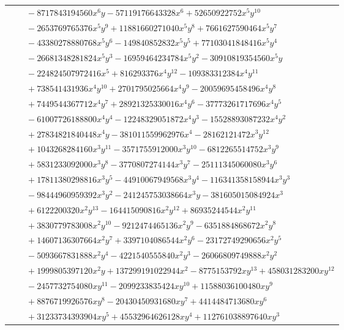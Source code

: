 \documentclass[11pt]{article}
\begin{document}
\begin{longtable}{@{}ll@{}}
 & $\quad -8717843194560x^{6}y-57119176643328x^{6}+52650922752x^{5}y^{10}$\\
 & $\quad -2653769765376x^{5}y^{9}+11881660271040x^{5}y^{8}+7661627590464x^{5}y^{7}$\\
 & $\quad -43380278880768x^{5}y^{6}-149840852832x^{5}y^{5}+77103041848416x^{5}y^{4}$\\
 & $\quad -26681348281824x^{5}y^{3}-16959464234784x^{5}y^{2}-30910819354560x^{5}y$\\
 & $\quad -224824507972416x^{5}+816293376x^{4}y^{12}-109383312384x^{4}y^{11}$\\
 & $\quad +738541431936x^{4}y^{10}+2701795025664x^{4}y^{9}-20059695458496x^{4}y^{8}$\\
 & $\quad +7449544367712x^{4}y^{7}+28921325330016x^{4}y^{6}-37773261717696x^{4}y^{5}$\\
 & $\quad -61007726188800x^{4}y^{4}-12248329051872x^{4}y^{3}-15528893087232x^{4}y^{2}$\\
 & $\quad +27834821840448x^{4}y-381011559962976x^{4}-28162121472x^{3}y^{12}$\\
 & $\quad +1043268284160x^{3}y^{11}-3571755912000x^{3}y^{10}-6812265514752x^{3}y^{9}$\\
 & $\quad +5831233092000x^{3}y^{8}-3770807274144x^{3}y^{7}-25111345060080x^{3}y^{6}$\\
 & $\quad +17811380298816x^{3}y^{5}-44910067949568x^{3}y^{4}-116341358158944x^{3}y^{3}$\\
 & $\quad -98444960959392x^{3}y^{2}-241245753038664x^{3}y-381605015084924x^{3}$\\
 & $\quad +6122200320x^{2}y^{13}-164415090816x^{2}y^{12}+86935244544x^{2}y^{11}$\\
 & $\quad +3830779783008x^{2}y^{10}-9212474465136x^{2}y^{9}-6351884868672x^{2}y^{8}$\\
 & $\quad +14607136307664x^{2}y^{7}+3397104086544x^{2}y^{6}-23172749290656x^{2}y^{5}$\\
 & $\quad -5093667831888x^{2}y^{4}-4221540555840x^{2}y^{3}-26066809749888x^{2}y^{2}$\\
 & $\quad +1999805397120x^{2}y+137299191022944x^{2}-8775153792xy^{13}+458031283200xy^{12}$\\
 & $\quad -2457732754080xy^{11}-2099233835424xy^{10}+11588036100480xy^{9}$\\
 & $\quad +8876719926576xy^{8}-20430450931680xy^{7}+4414484713680xy^{6}$\\
 & $\quad +31233734393904xy^{5}+45532964626128xy^{4}+112761038897640xy^{3}$\\

\end{longtable}
\end{document}
